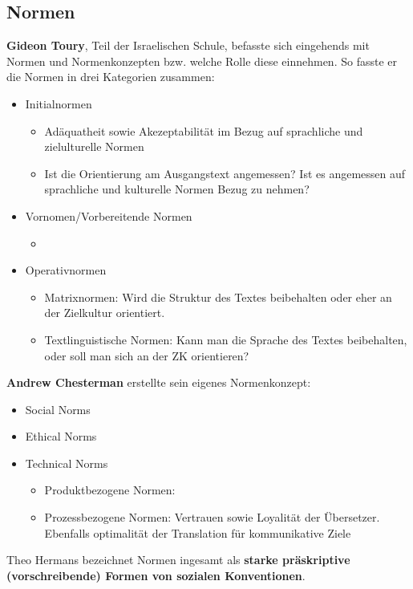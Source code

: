 \documentclass{article}
\begin{document}
	\subsection{Normen}
	\textbf{Gideon Toury}, Teil der Israelischen Schule, befasste sich eingehends mit Normen und Normenkonzepten bzw. welche Rolle diese einnehmen. So fasste er die Normen in drei Kategorien zusammen:
	\begin{itemize}
		\item{Initialnormen}
		\begin{itemize}
			\item{Adäquatheit sowie Akezeptabilität im Bezug auf sprachliche und zielulturelle Normen}
			\item{Ist die Orientierung am Ausgangstext angemessen? Ist es angemessen auf sprachliche und kulturelle Normen Bezug zu nehmen?}
		\end{itemize}
		\item{Vornomen/Vorbereitende Normen}
		\begin{itemize}
			\item{}
		\end{itemize}
		\item{Operativnormen}
		\begin{itemize}
			\item{Matrixnormen: Wird die Struktur des Textes beibehalten oder eher an der Zielkultur orientiert.}
			\item{Textlinguistische Normen: Kann man die Sprache des Textes beibehalten, oder soll man sich an der ZK orientieren?}
		\end{itemize}
	\end{itemize}

	\textbf{Andrew Chesterman} erstellte sein eigenes Normenkonzept:
	\begin{itemize}
		\item{Social Norms}
		\item{Ethical Norms}
		\item{Technical Norms}
		\begin{itemize}
			\item{Produktbezogene Normen: }
			\item{Prozessbezogene Normen: Vertrauen sowie Loyalität der Übersetzer. Ebenfalls optimalität der Translation für kommunikative Ziele}
		\end{itemize}
	\end{itemize}

	Theo Hermans bezeichnet Normen ingesamt als \textbf{starke präskriptive (vorschreibende) Formen von sozialen Konventionen}. \\
\end{document}
